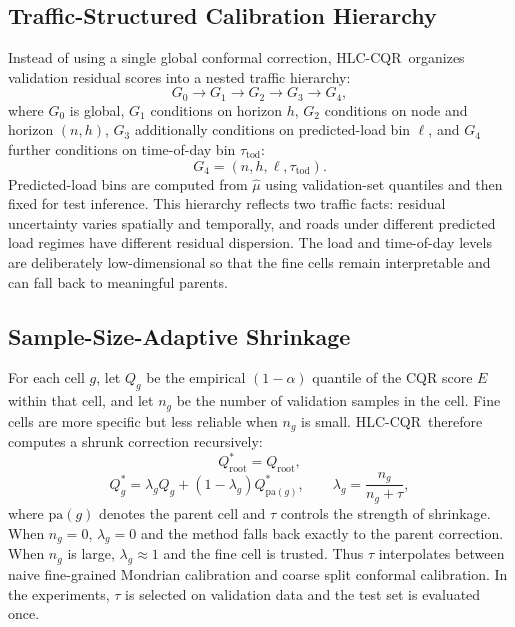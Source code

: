 \documentclass[letterpaper,journal]{IEEEtran}
\newcommand{\hlc}{HLC-CQR}
\begin{document}
\subsection{Traffic-Structured Calibration Hierarchy}
Instead of using a single global conformal correction, \hlc\ organizes validation residual scores into a nested traffic hierarchy:
\begin{equation}
    G_0\rightarrow G_1\rightarrow G_2\rightarrow G_3\rightarrow G_4,
\end{equation}
where $G_0$ is global, $G_1$ conditions on horizon $h$, $G_2$ conditions on node and horizon $(n,h)$, $G_3$ additionally conditions on predicted-load bin $\ell$, and $G_4$ further conditions on time-of-day bin $\tau_{\mathrm{tod}}$:
\begin{equation}
    G_4=(n,h,\ell,\tau_{\mathrm{tod}}).
\end{equation}
Predicted-load bins are computed from $\hat{\mu}$ using validation-set quantiles and then fixed for test inference. This hierarchy reflects two traffic facts: residual uncertainty varies spatially and temporally, and roads under different predicted load regimes have different residual dispersion. The load and time-of-day levels are deliberately low-dimensional so that the fine cells remain interpretable and can fall back to meaningful parents.

\subsection{Sample-Size-Adaptive Shrinkage}
For each cell $g$, let $Q_g$ be the empirical $(1-\alpha)$ quantile of the CQR score $E$ within that cell, and let $n_g$ be the number of validation samples in the cell. Fine cells are more specific but less reliable when $n_g$ is small. \hlc\ therefore computes a shrunk correction recursively:
\begin{equation}
    Q^*_{\mathrm{root}}=Q_{\mathrm{root}},
\end{equation}
\begin{equation}
    Q^*_g=\lambda_g Q_g+(1-\lambda_g)Q^*_{\mathrm{pa}(g)},
    \qquad
    \lambda_g=\frac{n_g}{n_g+\tau},
\end{equation}
where $\mathrm{pa}(g)$ denotes the parent cell and $\tau$ controls the strength of shrinkage. When $n_g=0$, $\lambda_g=0$ and the method falls back exactly to the parent correction. When $n_g$ is large, $\lambda_g\approx 1$ and the fine cell is trusted. Thus $\tau$ interpolates between naive fine-grained Mondrian calibration and coarse split conformal calibration. In the experiments, $\tau$ is selected on validation data and the test set is evaluated once.
\end{document}
